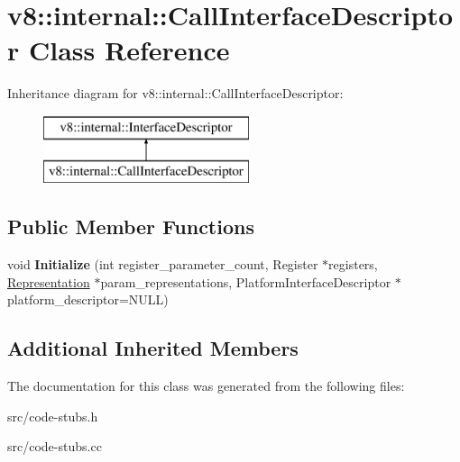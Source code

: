 \hypertarget{classv8_1_1internal_1_1_call_interface_descriptor}{}\section{v8\+:\+:internal\+:\+:Call\+Interface\+Descriptor Class Reference}
\label{classv8_1_1internal_1_1_call_interface_descriptor}
Inheritance diagram for v8\+:\+:internal\+:\+:Call\+Interface\+Descriptor\+:\begin{figure}[H]
\begin{center}
\leavevmode
\includegraphics[height=2.000000cm]{classv8_1_1internal_1_1_call_interface_descriptor}
\end{center}
\end{figure}
\subsection*{Public Member Functions}
\begin{DoxyCompactItemize}
\item 
\hypertarget{classv8_1_1internal_1_1_call_interface_descriptor_a4bc3777ff0ce41c01a5695f3d72068eb}{}void {\bfseries Initialize} (int register\+\_\+parameter\+\_\+count, Register $\ast$registers, \hyperlink{classv8_1_1internal_1_1_representation}{Representation} $\ast$param\+\_\+representations, Platform\+Interface\+Descriptor $\ast$platform\+\_\+descriptor=N\+U\+L\+L)\label{classv8_1_1internal_1_1_call_interface_descriptor_a4bc3777ff0ce41c01a5695f3d72068eb}

\end{DoxyCompactItemize}
\subsection*{Additional Inherited Members}


The documentation for this class was generated from the following files\+:\begin{DoxyCompactItemize}
\item 
src/code-\/stubs.\+h\item 
src/code-\/stubs.\+cc\end{DoxyCompactItemize}
